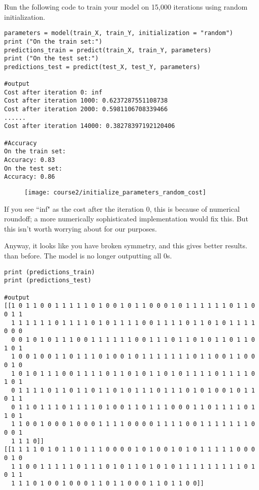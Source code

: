 Run the following code to train your model on 15,000 iterations using random initialization.
\begin{verbatim}
parameters = model(train_X, train_Y, initialization = "random")
print ("On the train set:")
predictions_train = predict(train_X, train_Y, parameters)
print ("On the test set:")
predictions_test = predict(test_X, test_Y, parameters)

#output
Cost after iteration 0: inf
Cost after iteration 1000: 0.6237287551108738
Cost after iteration 2000: 0.5981106708339466
......
Cost after iteration 14000: 0.38278397192120406

#Accuracy
On the train set:
Accuracy: 0.83
On the test set:
Accuracy: 0.86
\end{verbatim}
\vspace{-0.5cm}
\begin{figure}[h]
\begin{center}
\texttt{[image: course2/initialize\_parameters\_random\_cost]}
\end{center}
\end{figure}


If you see ``inf" as the cost after the iteration 0, this is because of numerical roundoff; a more numerically sophisticated implementation would fix this. But this isn't worth worrying about for our purposes.

Anyway, it looks like you have broken symmetry, and this gives better results. than before. The model is no longer outputting all 0s.

\begin{verbatim}
print (predictions_train)
print (predictions_test)

#output
[[1 0 1 1 0 0 1 1 1 1 1 0 1 0 0 1 0 1 1 0 0 0 1 0 1 1 1 1 1 1 0 1 1 0 0 1 1
  1 1 1 1 1 1 0 1 1 1 1 0 1 0 1 1 1 1 0 0 1 1 1 1 0 1 1 0 1 0 1 1 1 1 0 0 0
  0 0 1 0 1 0 1 1 1 0 0 1 1 1 1 1 1 0 0 1 1 1 0 1 1 0 1 0 1 1 0 1 1 0 1 0 1
  1 0 0 1 0 0 1 1 0 1 1 1 0 1 0 0 1 0 1 1 1 1 1 1 1 0 1 1 0 0 1 1 0 0 0 1 0
  1 0 1 0 1 1 1 0 0 1 1 1 1 0 1 1 0 1 0 1 1 0 1 0 1 1 1 1 0 1 1 1 1 0 1 0 1
  0 1 1 1 1 0 1 1 0 1 1 0 1 1 0 1 0 1 1 1 0 1 1 1 0 1 0 1 0 0 1 0 1 1 0 1 1
  0 1 1 0 1 1 1 0 1 1 1 1 0 1 0 0 1 1 0 1 1 1 0 0 0 1 1 0 1 1 1 1 0 1 1 0 1
  1 1 0 0 1 0 0 0 1 0 0 0 1 1 1 1 0 0 0 0 1 1 1 1 0 0 1 1 1 1 1 1 1 0 0 0 1
  1 1 1 0]]
[[1 1 1 1 0 1 0 1 1 0 1 1 1 0 0 0 0 1 0 1 0 0 1 0 1 0 1 1 1 1 1 0 0 0 0 1 0
  1 1 0 0 1 1 1 1 1 0 1 1 1 0 1 0 1 1 0 1 0 1 0 1 1 1 1 1 1 1 1 1 0 1 0 1 1
  1 1 1 0 1 0 0 1 0 0 0 1 1 0 1 1 0 0 0 1 1 0 1 1 0 0]]
\end{verbatim}

